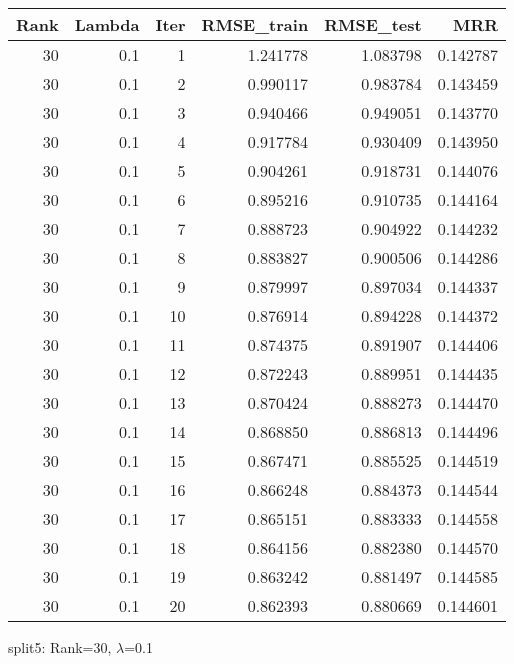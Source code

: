 \begin{tabular}{rrrrrr}
\toprule
 Rank &  Lambda &  Iter &  RMSE\_train &  RMSE\_test &       MRR \\
\midrule
   30 &     0.1 &     1 &    1.241778 &   1.083798 &  0.142787 \\
   30 &     0.1 &     2 &    0.990117 &   0.983784 &  0.143459 \\
   30 &     0.1 &     3 &    0.940466 &   0.949051 &  0.143770 \\
   30 &     0.1 &     4 &    0.917784 &   0.930409 &  0.143950 \\
   30 &     0.1 &     5 &    0.904261 &   0.918731 &  0.144076 \\
   30 &     0.1 &     6 &    0.895216 &   0.910735 &  0.144164 \\
   30 &     0.1 &     7 &    0.888723 &   0.904922 &  0.144232 \\
   30 &     0.1 &     8 &    0.883827 &   0.900506 &  0.144286 \\
   30 &     0.1 &     9 &    0.879997 &   0.897034 &  0.144337 \\
   30 &     0.1 &    10 &    0.876914 &   0.894228 &  0.144372 \\
   30 &     0.1 &    11 &    0.874375 &   0.891907 &  0.144406 \\
   30 &     0.1 &    12 &    0.872243 &   0.889951 &  0.144435 \\
   30 &     0.1 &    13 &    0.870424 &   0.888273 &  0.144470 \\
   30 &     0.1 &    14 &    0.868850 &   0.886813 &  0.144496 \\
   30 &     0.1 &    15 &    0.867471 &   0.885525 &  0.144519 \\
   30 &     0.1 &    16 &    0.866248 &   0.884373 &  0.144544 \\
   30 &     0.1 &    17 &    0.865151 &   0.883333 &  0.144558 \\
   30 &     0.1 &    18 &    0.864156 &   0.882380 &  0.144570 \\
   30 &     0.1 &    19 &    0.863242 &   0.881497 &  0.144585 \\
   30 &     0.1 &    20 &    0.862393 &   0.880669 &  0.144601 \\
\bottomrule
\end{tabular}

\caption{split5: Rank=30, $\lambda$=0.1}
